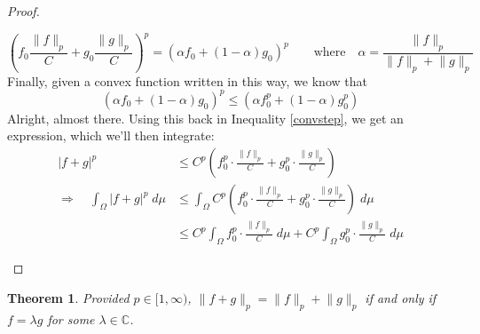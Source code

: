 \documentclass[12pt]{article}
\theoremstyle{plain}
\newtheorem{thm}{Theorem}[subsection]
\theoremstyle{definition}
\theoremstyle{remark}
\begin{document}
\begin{proof}
\begin{enumerate}
\[
    \left(f_0\frac{\lVert f\rVert_p}{C}
    + g_0\frac{\lVert g\rVert_p}{C}\right)^p
    = 
    \left(\alpha f_0
    + (1-\alpha)g_0\right)^p
    \qquad \text{where}\quad
    \alpha=\frac{\lVert f\rVert_p}{\lVert f\rVert_p 
    +\lVert g\rVert_p }
\]
Finally, given a convex function written in this way, we know that 
\[
    \left(\alpha f_0
    + (1-\alpha)g_0\right)^p
    \leq 
    \left(\alpha f_0^p
    + (1-\alpha)g_0^p\right)
\]
Alright, almost there. Using this back in Inequality \ref{convstep}, we get an expression, which we'll then integrate:
\begin{align*}
    |f+g|^p  &\leq 
    C^p\left(f_0^p\cdot\frac{\lVert f\rVert_p}{C}
    + g_0^p\cdot\frac{\lVert g\rVert_p}{C}\right)\\
    \Rightarrow\quad
    \int_\Omega|f+g|^p \;d\mu &\leq \int_\Omega
    C^p\left(f_0^p\cdot\frac{\lVert f\rVert_p}{C}
    + g_0^p\cdot\frac{\lVert g\rVert_p}{C}\right)\;d\mu \\
    &\leq C^p
    \int_\Omega f_0^p\cdot\frac{\lVert f\rVert_p}{C}
    \;d\mu+ C^p\int_\Omega 
    g_0^p\cdot\frac{\lVert g\rVert_p}{C}\;d\mu
\end{align*}
\end{enumerate}
\end{proof}

\begin{thm}
Provided $p\in[1,\infty)$, $\lVert f+g\rVert_p=\lVert f\rVert_p+\lVert g\rVert_p$ if and only if $f=\lambda g$ for some $\lambda\in \mathbb{C}$.
\end{thm}
\end{document}
